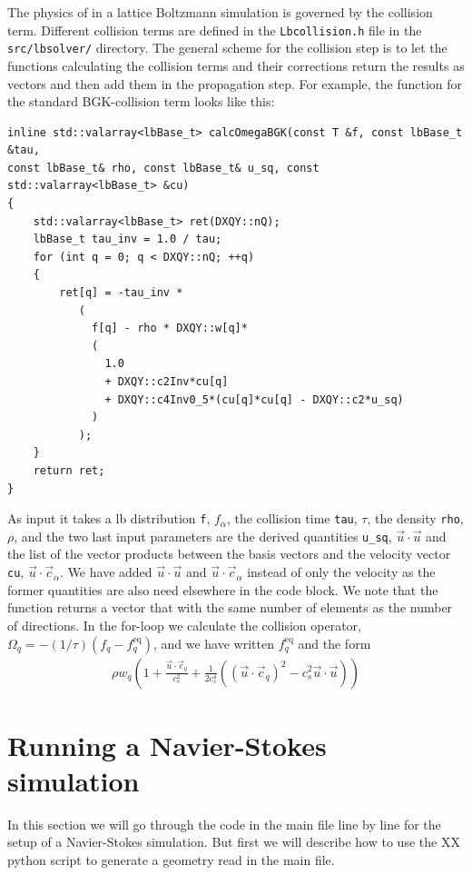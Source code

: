 \documentclass[11pt,a4paper]{report}
\begin{document}
The physics of in a lattice Boltzmann simulation is governed by the  collision term. Different collision terms are defined in the \texttt{Lbcollision.h} file in the \texttt{src/lbsolver/} directory. The general scheme for the collision step is to let the functions calculating the collision terms and their corrections return the results as vectors and then add them in the propagation step.  For example, the function for the standard BGK-collision term looks like this:
\begin{verbatim}
inline std::valarray<lbBase_t> calcOmegaBGK(const T &f, const lbBase_t &tau, 
const lbBase_t& rho, const lbBase_t& u_sq, const std::valarray<lbBase_t> &cu)
{
    std::valarray<lbBase_t> ret(DXQY::nQ);
    lbBase_t tau_inv = 1.0 / tau;
    for (int q = 0; q < DXQY::nQ; ++q)
    {
        ret[q] = -tau_inv * 
           ( 
             f[q] - rho * DXQY::w[q]*
             (
               1.0 
               + DXQY::c2Inv*cu[q] 
               + DXQY::c4Inv0_5*(cu[q]*cu[q] - DXQY::c2*u_sq) 
             ) 
           );
    }
    return ret;
}
\end{verbatim}  
As input it takes a lb distribution \texttt{f}, $f_\alpha$, the collision time \texttt{tau}, $\tau$, the density \texttt{rho}, $\rho$, and the two last input parameters are the derived quantities \texttt{u\_sq}, $\vec{u}\cdot\vec{u}$ and the list of the vector products between the basis vectors and the velocity vector \texttt{cu}, $\vec{u}\cdot\vec{c}_\alpha$. We have added $\vec{u}\cdot\vec{u}$ and $\vec{u}\cdot\vec{c}_\alpha$ instead of only the velocity as the former quantities are also need elsewhere in the code block. 
We note that the function returns a vector that with the same number of elements as the number of directions.   In the for-loop we calculate the collision operator, $\Omega_q = -(1/\tau)(f_q - f^\mathrm{eq}_q)$, and we have written $f^\mathrm{eq}_q$ and the form 
\begin{align*}
\rho w_q \left(1 + \frac{\vec{u}\cdot\vec{c}_q}{c_s^2} + \frac{1}{2c_s^4}\left((\vec{u}\cdot\vec{c}_q)^2 - c_s^2\vec{u}\cdot\vec{u}\right)\right)
\end{align*}


\section{Running a Navier-Stokes simulation}
\label{sec:running a navier-stokes simulation}
In this section we will go through the code in the main file line by line for the setup of a Navier-Stokes simulation. But first we will describe how to use the XX python script to generate a geometry read in the main file. 
\end{document}
